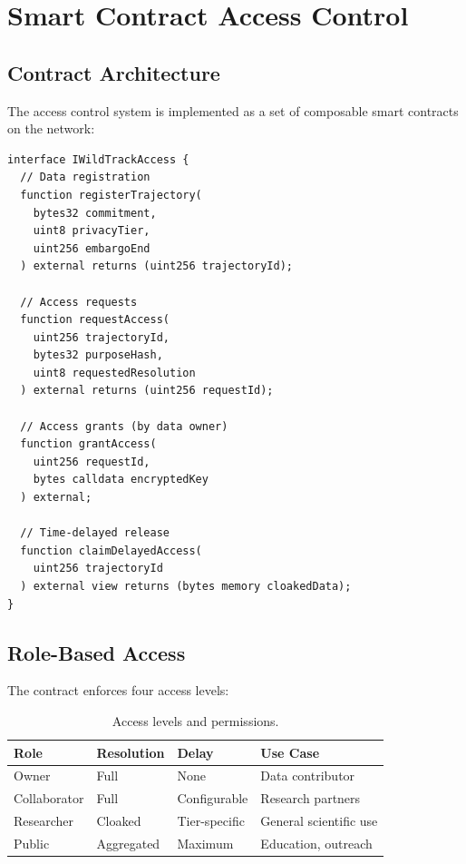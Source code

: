 \section{Smart Contract Access Control}


\subsection{Contract Architecture}

The \WildTrack{} access control system is implemented as a set of composable smart contracts on the \Zoo{} network:

\begin{lstlisting}[basicstyle=\footnotesize\ttfamily, frame=single, caption={WildTrack access control interface (Solidity-like pseudocode).}]
interface IWildTrackAccess {
  // Data registration
  function registerTrajectory(
    bytes32 commitment,
    uint8 privacyTier,
    uint256 embargoEnd
  ) external returns (uint256 trajectoryId);

  // Access requests
  function requestAccess(
    uint256 trajectoryId,
    bytes32 purposeHash,
    uint8 requestedResolution
  ) external returns (uint256 requestId);

  // Access grants (by data owner)
  function grantAccess(
    uint256 requestId,
    bytes calldata encryptedKey
  ) external;

  // Time-delayed release
  function claimDelayedAccess(
    uint256 trajectoryId
  ) external view returns (bytes memory cloakedData);
}
\end{lstlisting}

\subsection{Role-Based Access}

The contract enforces four access levels:

\begin{table}[htbp]
\centering
\caption{Access levels and permissions.}
\label{tab:access}
\begin{tabular}{lllp{5cm}}
\toprule
\textbf{Role} & \textbf{Resolution} & \textbf{Delay} & \textbf{Use Case} \\
\midrule
Owner & Full & None & Data contributor \\
Collaborator & Full & Configurable & Research partners \\
Researcher & Cloaked & Tier-specific & General scientific use \\
Public & Aggregated & Maximum & Education, outreach \\
\bottomrule
\end{tabular}
\end{table}

